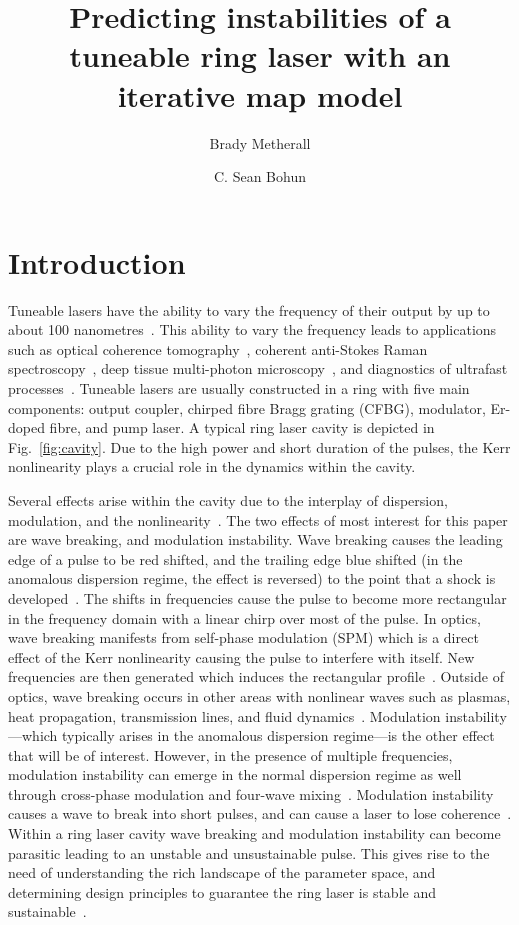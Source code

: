 \documentclass[9pt,twocolumn,twoside]{osajnl}
\title{Predicting instabilities of a tuneable ring laser with an iterative map model}
\author[1]{Brady Metherall}
\author[2,*]{C. Sean Bohun}
\affil[1]{Mathematical Institute, University of Oxford, Radcliffe Observatory Quarter, Woodstock Rd, Oxford OX2 6GG, UK}
\affil[2]{Facutlty of Science, University of Ontario Institute of Technology, 2000 Simcoe St N, Oshawa, ON L1G 0C5, Canada}
\affil[3]{brady.metherall@maths.ox.ac.uk}
\affil[4]{sean.bohun@uoit.ca}
\begin{document}
\maketitle

\section{Introduction}
\label{sec:intro}
Tuneable lasers have the ability to vary the frequency of their output by up to about 100 nanometres~\cite{bohun2015, burgoyne2010, yamashita2009}. This ability to vary the frequency leads to applications such as optical coherence tomography~\cite{bohun2015, burgoyne2014, yamashita2009}, coherent anti-Stokes Raman spectroscopy~\cite{burgoyne2014}, deep tissue multi-photon microscopy~\cite{chung2017}, and diagnostics of ultrafast processes~\cite{burgoyne2014, silfvast2004}. Tuneable lasers are usually constructed in a ring with five main components: output coupler, chirped fibre Bragg grating (CFBG), modulator, Er-doped fibre, and pump laser. A typical ring laser cavity is depicted in Fig.~\ref{fig:cavity}. Due to the high power and short duration of the pulses, the Kerr nonlinearity plays a crucial role in the dynamics within the cavity.

Several effects arise within the cavity due to the interplay of dispersion, modulation, and the nonlinearity~\cite{bohun2015, coen1997, lapre2019, meng2020, shao2019, woodward2018}. The two effects of most interest for this paper are wave breaking, and modulation instability. Wave breaking causes the leading edge of a pulse to be red shifted, and the trailing edge blue shifted (in the anomalous dispersion regime, the effect is reversed) to the point that a shock is developed~\cite{anderson1992, rothenberg1989a, rothenberg1989b, tomlinson1984, tomlinson1985}. The shifts in frequencies cause the pulse to become more rectangular in the frequency domain with a linear chirp over most of the pulse. In optics, wave breaking manifests from self-phase modulation (SPM) which is a direct effect of the Kerr nonlinearity causing the pulse to interfere with itself. New frequencies are then generated which induces the rectangular profile~\cite{agrawal2013, woodward2018}. Outside of optics, wave breaking occurs in other areas with nonlinear waves such as plasmas, heat propagation, transmission lines, and fluid dynamics~\cite{rothenberg1989b}. Modulation instability---which typically arises in the anomalous dispersion regime---is the other effect that will be of interest. However, in the presence of multiple frequencies, modulation instability can emerge in the normal dispersion regime as well through cross-phase modulation and four-wave mixing~\cite{agrawal1987, agrawal2013, haelterman1992}. Modulation instability causes a wave to break into short pulses, and can cause a laser to lose coherence~\cite{agrawal1987, coen1997, haelterman1992}. Within a ring laser cavity wave breaking and modulation instability can become parasitic leading to an unstable and unsustainable pulse. This gives rise to the need of understanding the rich landscape of the parameter space, and determining design principles to guarantee the ring laser is stable and sustainable~\cite{bohun2015, burgoyneemail, finot2008, lapre2019, woodward2018}.
\end{document}
